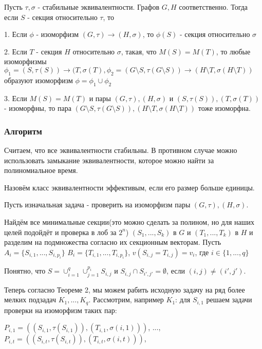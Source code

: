 \begin{theorem}
    Пусть $\tau, \sigma$ - стабильные эквивалентности. Графов $G, H$ соответственно. Тогда если $S$ - секция относительно $\tau$, то

    1. Если $\phi$ - изоморфизм $(G, \tau) \rightarrow (H, \sigma)$, то $\phi(S)$ - секция относительно $\sigma$

    2. Если $T$ - секция $H$ относительно $\sigma$, такая, что $M(S) = M(T)$, то любые изоморфизмы $\phi_1=(S, \tau(S)) \rightarrow (T, \sigma(T), \phi_2=(G \text{\textbackslash} S, \tau(G\text{\textbackslash} S)) \rightarrow (H\text{\textbackslash} T, \sigma(H\text{\textbackslash} T))$ образуют изоморфизм $\phi = \phi_1 \cup \phi_2$ 

    3. Если $M(S) = M(T)$ и пары $(G, \tau), (H, \sigma)$ и $(S, \tau(S)), (T, \sigma(T))$ - изоморфны, то пара $(G \text{\textbackslash} S, \tau(G\text{\textbackslash} S)), (H\text{\textbackslash} T, \sigma(H\text{\textbackslash} T))$ тоже изоморфна.
\end{theorem}

\subsubsection*{Алгоритм}

Считаем, что все эквивалентности стабильны. В противном случае можно использовать замыкание эквивалентности, которое можно найти за полиномиальное время.

Назовём класс эквивалентности эффективым, если его размер больше единицы.

Пусть изначальная задача - проверить на изоморфизм пары $(G, \tau), (H, \sigma)$. 

Найдём все минимальные секции(это можно сделать за полином, но для наших целей подойдёт и проверка в лоб за $2^n$) $(S_1, ..., S_k)$ в $G$ и $(T_1, ..., T_k)$ в $H$ и разделим на подмножества согласно их секционным векторам. Пусть $A_i = \{S_{i, 1}, ..., S_{i, p_{i}}\}$  $B_i = \{T_{i, 1}, ..., T_{i, p_{i}}\}$, $v(S_{i, j}=T_{i, j}) = v_i$, где $i \in \{1, ..., q\}$

Понятно, что $S = \cup_{i=1}^q \cup_{j=1}^{p_i}S_{i, j}$ и $S_{i, j} \cap S_{i', j'} = \emptyset$, если $(i, j) \neq (i', j')$.

Теперь согласно Теореме 2, мы можем рабить исходную задачу на ряд более мелких подзадач $K_1, ..., K_q$. Рассмотрим, например $K_1$: для $S_{i, 1}$ решаем задачи проверки на изоморфизм таких пар:

$P_{i, 1}=((S_{i, 1}, \tau(S_{i, 1})), (T_{i, 1}, \sigma(i, 1)))$, ..., $P_{i, t}=((S_{i, t}, \tau(S_{i, t})), (T_{i, t}, \sigma(i, t)))$,

